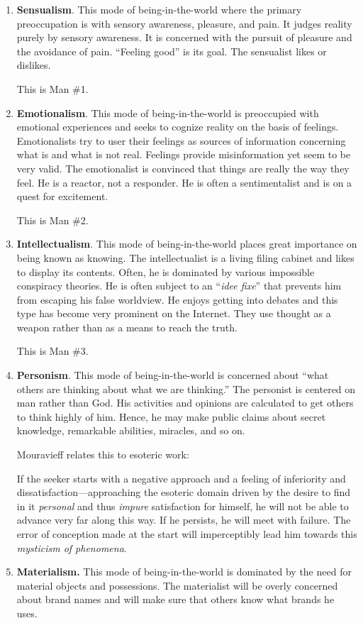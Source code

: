 \begin{enumerate}


\item \textbf{Sensualism}. This mode of being-in-the-world where the primary preoccupation is with sensory awareness, pleasure, and pain. It judges reality purely by sensory awareness. It is concerned with the pursuit of pleasure and the avoidance of pain. ``Feeling good'' is its goal. The sensualist likes or dislikes.

This is Man \#1.

\item \textbf{Emotionalism}. This mode of being-in-the-world is preoccupied with emotional experiences and seeks to cognize reality on the basis of feelings. Emotionalists try to user their feelings as sources of information concerning what is and what is not real. Feelings provide misinformation yet seem to be very valid. The emotionalist is convinced that things are really the way they feel. He is a reactor, not a responder. He is often a sentimentalist and is on a quest for excitement.

This is Man \#2.

\item \textbf{Intellectualism}. This mode of being-in-the-world places great importance on being known as knowing. The intellectualist is a living filing cabinet and likes to display its contents. Often, he is dominated by various impossible conspiracy theories. He is often subject to an ``\emph{idee fixe}'' that prevents him from escaping his false worldview. He enjoys getting into debates and this type has become very prominent on the Internet. They use thought as a weapon rather than as a means to reach the truth.

This is Man \#3.

\item \textbf{Personism}. This mode of being-in-the-world is concerned about ``what others are thinking about what we are thinking.'' The personist is centered on man rather than God. His activities and opinions are calculated to get others to think highly of him. Hence, he may make public claims about secret knowledge, remarkable abilities, miracles, and so on.

Mouravieff relates this to esoteric work:

\begin{quotex}
If the seeker starts with a negative approach and a feeling of inferiority and dissatisfaction---approaching the esoteric domain driven by the desire to find in it \emph{personal} and thus \emph{impure} satisfaction for himself, he will not be able to advance very far along this way. If he persists, he will meet with failure. The error of conception made at the start will imperceptibly lead him towards this \emph{mysticism of phenomena}.
\end{quotex}


\item \textbf{Materialism.} This mode of being-in-the-world is dominated by the need for material objects and possessions. The materialist will be overly concerned about brand names and will make sure that others know what brands he uses.
\end{enumerate}


